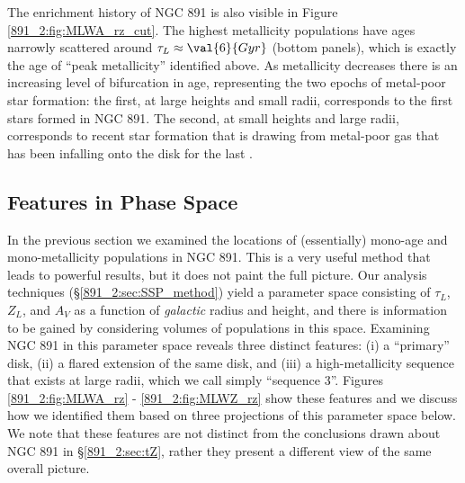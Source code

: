 The enrichment history of NGC 891 is also visible in Figure
\ref{891_2:fig:MLWA_rz_cut}. The highest metallicity populations have
ages narrowly scattered around $\tau_L \approx \val{6}{Gyr}$ (bottom
panels), which is exactly the age of ``peak metallicity'' identified
above. As metallicity decreases there is an increasing level of
bifurcation in age, representing the two epochs of metal-poor star
formation: the first, at large heights and small radii, corresponds to
the first stars formed in NGC 891. The second, at small heights and
large radii, corresponds to recent star formation that is drawing from
metal-poor gas that has been infalling onto the disk for the last
.

\subsection{Features in Phase Space}
\label{891_2:sec:rz}

In the previous section we examined the locations of (essentially)
mono-age and mono-metallicity populations in NGC 891. This is a very
useful method that leads to powerful results, but it does not paint
the full picture.  Our analysis techniques
(\S\ref{891_2:sec:SSP_method}) yield a parameter space consisting of
$\tau_L$, $Z_L$, and $A_V$ as a function of \emph{galactic} radius and
height, and there is information to be gained by considering volumes
of populations in this space. Examining NGC 891 in this parameter
space reveals three distinct features: (i) a ``primary'' disk, (ii) a
flared extension of the same disk, and (iii) a high-metallicity
sequence that exists at large radii, which we call simply ``sequence
3''. Figures \ref{891_2:fig:MLWA_rz} - \ref{891_2:fig:MLWZ_rz} show
these features and we discuss how we identified them based on three
projections of this parameter space below. We note that these features
are not distinct from the conclusions drawn about NGC 891 in
\S\ref{891_2:sec:tZ}, rather they present a different view of the same
overall picture.




